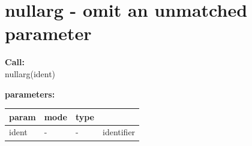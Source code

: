 %        
%        
%        
%        
%
%        
%        
%        


    \section{nullarg - omit an unmatched parameter}\label{sec:ifnullarg}
        
        
        {\bf Call:} \\
        nullarg(ident)
        
        {\bf parameters:} \\
        \begin{tabular}{| l | l | l | l |}
        \hline
        param  & mode & type & \\
        \hline \hline
        ident & - &  -  & identifier \\ \hline
        \end{tabular}
        
